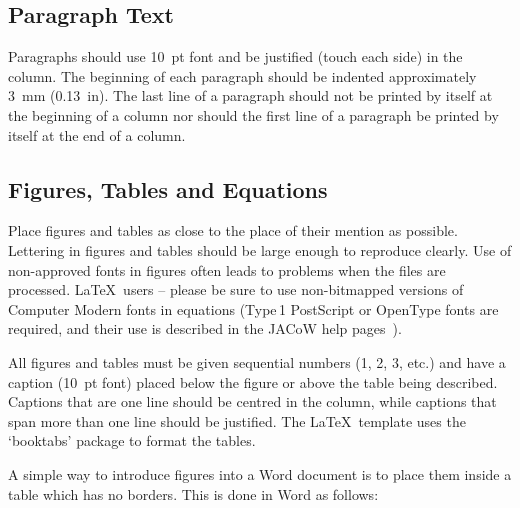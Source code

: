 \documentclass[a4paper]{jacow}
\begin{document}
\subsection{Paragraph Text}

Paragraphs should use \SI{10}{pt} font and be justified (touch each side) in
the column. The beginning of each paragraph should be indented
approximately \SI{3}{mm} (\SI{0.13}{in}). The last line of a paragraph should not be
printed by itself at the beginning of a column nor should the first line of
a paragraph be printed by itself at the end of a column.

\subsection{Figures, Tables and Equations}

Place figures and tables as close to the place of their mention as
possible. Lettering in figures and tables should be large enough to
reproduce clearly. Use of non-approved fonts in figures often leads to
problems when the files are processed. \LaTeX\ users -- please be sure to use
non-bitmapped versions of Computer Modern fonts in equations (Type\,1 PostScript
or OpenType fonts are required, and their use is described in the JACoW help
pages~\cite{jacow-help}).

All figures and tables must be given sequential numbers (1, 2, 3, etc.) and
have a caption (\SI{10}{pt} font) placed below the figure or above the table being described.
Captions that are one line should be centred in the column, while captions
that span more than one line should be justified. The \LaTeX\ template uses the \enquote*{booktabs}
package to format the tables.

A simple way to introduce figures into a Word document is to place them inside a table which has no borders. This is done in Word as follows:
\end{document}
